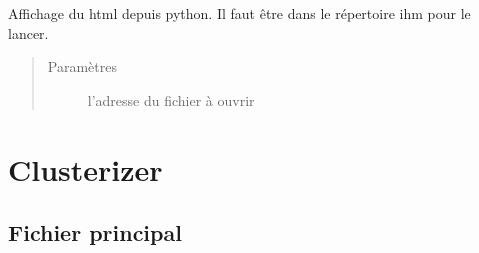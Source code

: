 \documentclass[letterpaper,10pt,french]{sphinxmanual}
\begin{document}
\begin{fulllineitems}
\label{\detokenize{index:src.ihm.web.open_html}}
\sphinxAtStartPar
Affichage du html depuis python. Il faut être dans le répertoire ihm pour le lancer.
\begin{quote}\begin{description}
\item[{Paramètres}] \leavevmode
\sphinxAtStartPar
{} \textendash{} l’adresse du fichier à ouvrir

\end{description}\end{quote}

\end{fulllineitems}



\chapter{Clusterizer}
\label{\detokenize{index:clusterizer}}

\section{Fichier principal}
\label{\detokenize{index:module-src.clusterizer.clusterizer}}\label{\detokenize{index:fichier-principal}}
\end{document}
